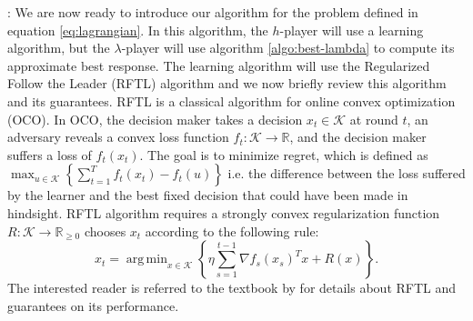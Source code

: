 \documentclass{article}
\newtheorem{theorem}{Theorem}
\newcommand{\bbR}{\mathbb{R}}
\DeclareMathOperator*{\argmin}{arg\,min}
\newcommand{\Kc}{\mathcal{K}}
\newcommand{\norm}[1]{\lVert #1 \rVert}
\begin{document}
:
 We are now ready to introduce our algorithm for the problem defined in equation \ref{eq:lagrangian}. In this algorithm, the $h$-player will use a learning algorithm, but the $\lambda$-player will use algorithm \ref{algo:best-lambda} to compute its approximate best response. The learning algorithm will use the Regularized Follow the Leader (RFTL) algorithm and we now briefly review this algorithm and its guarantees. RFTL is a classical algorithm for online convex optimization (OCO). In OCO, the decision maker takes a decision $x_t \in \Kc$ at round $t$, an adversary reveals a convex loss function $f_t:\Kc \rightarrow \bbR$, and the decision maker suffers a loss of $f_t(x_t)$. The goal is to minimize regret, which is defined as $\max_{u \in \Kc}\left\{\sum_{t=1}^T f_t(x_t) - f_t(u)\right\}$ i.e. the difference between the loss suffered by the learner and the best fixed decision that could have been made in hindsight. RFTL algorithm requires a strongly convex regularization function $R:\Kc \rightarrow \bbR_{\ge 0}$ chooses $x_t$ according to the following rule:
$$x_{t} = \argmin_{x \in \Kc} \left\{\eta \sum_{s=1}^{t-1} \nabla f_s(x_s)^T x + R(x)  \right\}.$$
The interested reader is referred to the textbook by \cite{Hazan16} for details about RFTL and guarantees on its performance.


\end{document}
